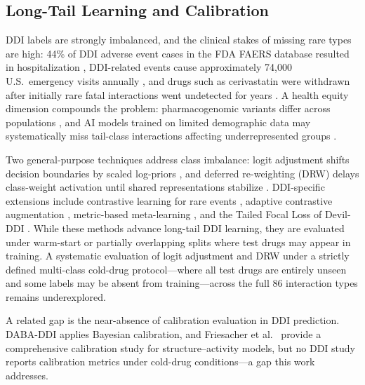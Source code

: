 \documentclass[11pt,a4paper,twocolumn]{article}
\begin{document}
\subsection{Long-Tail Learning and Calibration}
\label{sec:longtail}
DDI labels are strongly imbalanced, and the clinical stakes of missing rare types
are high: 44\% of DDI adverse event cases in the FDA FAERS database resulted in
hospitalization \cite{faers2024}, DDI-related events cause approximately 74{,}000
U.S.\ emergency visits annually \cite{ren2025rareddie}, and drugs such as
cerivastatin were withdrawn after initially rare fatal interactions went undetected
for years \cite{clinther2022ddi}.
A health equity dimension compounds the problem: pharmacogenomic variants differ
across populations \cite{pharmacogenomics2023equity}, and AI models trained on
limited demographic data may systematically miss tail-class interactions affecting
underrepresented groups \cite{habre2025aiadvancing}.

Two general-purpose techniques address class imbalance: logit adjustment shifts
decision boundaries by scaled log-priors \cite{menon2021logit}, and deferred
re-weighting (DRW) delays class-weight activation until shared representations
stabilize \cite{cao2019ldam}.
DDI-specific extensions include contrastive learning for rare events
\cite{xiong2023mrgnn}, adaptive contrastive augmentation \cite{mhafrddi2025},
metric-based meta-learning \cite{ren2025rareddie}, and the Tailed Focal Loss of
Devil-DDI \cite{devilddi2024}.
While these methods advance long-tail DDI learning, they are evaluated under
warm-start or partially overlapping splits where test drugs may appear in
training.
A systematic evaluation of logit adjustment and DRW under a strictly defined
multi-class cold-drug protocol---where all test drugs are entirely unseen and
some labels may be absent from training---across the full 86 interaction types
remains underexplored.

A related gap is the near-absence of calibration evaluation in DDI prediction.
DABA-DDI \cite{daba2025} applies Bayesian calibration, and Friesacher et al.\ \cite{friesacher2025calibration} provide a comprehensive calibration study for
structure--activity models, but no DDI study reports calibration metrics under
cold-drug conditions---a gap this work addresses.

\end{document}
